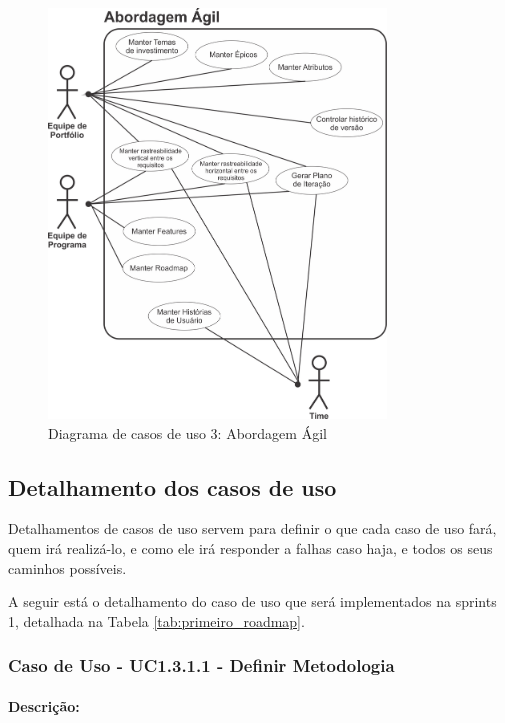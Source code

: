 \begin{figure}[H]
	\centering
	\includegraphics[width=0.8\textwidth]{imgModelagem/DiagramaUC3}
	\caption{Diagrama de casos de uso 3: Abordagem Ágil}
	\label{img:DiagramaUC3}
\end{figure}

\subsection{Detalhamento dos casos de uso}

Detalhamentos de casos de uso servem para definir o que cada caso de uso fará, quem irá realizá-lo, e como ele irá responder a falhas caso haja, e todos os seus caminhos possíveis.

A seguir está o detalhamento do caso de uso que será implementados na sprints 1, detalhada na Tabela \ref{tab:primeiro_roadmap}.

\subsubsection{Caso de Uso - UC1.3.1.1 - Definir Metodologia}

\paragraph{Descrição:}

